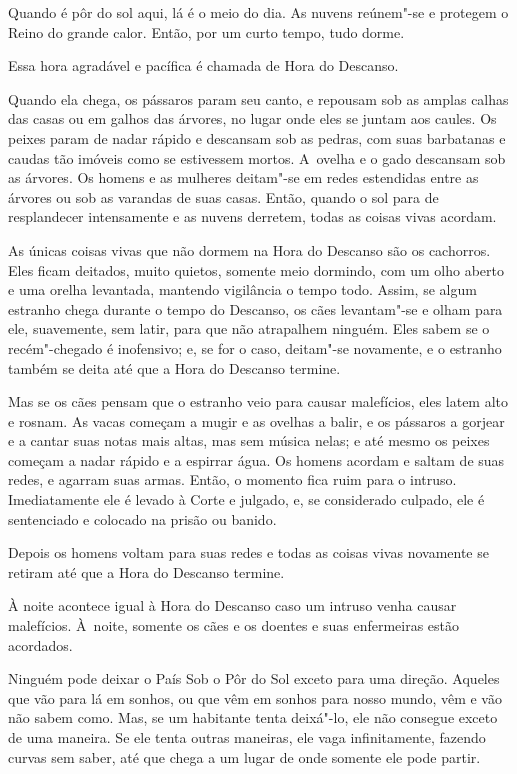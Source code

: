 Quando é pôr do sol aqui, lá é o meio do dia. As nuvens reúnem"-se e
protegem o Reino do grande calor. Então, por um curto tempo, tudo dorme.

Essa hora agradável e pacífica é chamada de Hora do Descanso.

Quando ela chega, os pássaros param seu canto, e repousam sob as amplas
calhas das casas ou em galhos das árvores, no lugar onde eles se juntam
aos caules. Os peixes param de nadar rápido e descansam sob as pedras,
com suas barbatanas e caudas tão imóveis como se estivessem mortos. A~ovelha e o gado descansam sob as árvores. Os homens e as mulheres
deitam"-se em redes estendidas entre as árvores ou sob as varandas de
suas casas. Então, quando o sol para de resplandecer intensamente e as
nuvens derretem, todas as coisas vivas acordam.

As únicas coisas vivas que não dormem na Hora do Descanso são os
cachorros. Eles ficam deitados, muito quietos, somente meio dormindo,
com um olho aberto e uma orelha levantada, mantendo vigilância o tempo
todo. Assim, se algum estranho chega durante o tempo do Descanso, os
cães levantam"-se e olham para ele, suavemente, sem latir, para que não
atrapalhem ninguém. Eles sabem se o recém"-chegado é inofensivo; e, se
for o caso, deitam"-se novamente, e o estranho também se deita até que a
Hora do Descanso termine.

Mas se os cães pensam que o estranho veio para causar malefícios, eles
latem alto e rosnam. As vacas começam a mugir e as ovelhas a balir, e os
pássaros a gorjear e a cantar suas notas mais altas, mas sem música
nelas; e até mesmo os peixes começam a nadar rápido e a espirrar água.
Os homens acordam e saltam de suas redes, e agarram suas armas. Então, o
momento fica ruim para o intruso. Imediatamente ele é levado à Corte e
julgado, e, se considerado culpado, ele é sentenciado e colocado na
prisão ou banido.

Depois os homens voltam para suas redes e todas as coisas vivas
novamente se retiram até que a Hora do Descanso termine.

À noite acontece igual à Hora do Descanso caso um intruso venha causar
malefícios. À~noite, somente os cães e os doentes e suas enfermeiras
estão acordados.

Ninguém pode deixar o País Sob o Pôr do Sol exceto para uma direção.
Aqueles que vão para lá em sonhos, ou que vêm em sonhos para nosso
mundo, vêm e vão não sabem como. Mas, se um habitante tenta deixá"-lo,
ele não consegue exceto de uma maneira. Se ele tenta outras maneiras,
ele vaga infinitamente, fazendo curvas sem saber, até que chega a um
lugar de onde somente ele pode partir.

